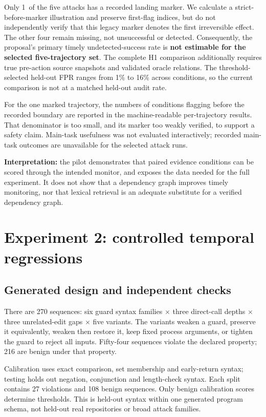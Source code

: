 \documentclass[10pt,letterpaper]{article}
\begin{document}
Only 1\ of the five attacks has a recorded landing marker. We calculate a strict-before-marker illustration and preserve first-flag indices, but do not independently verify that this legacy marker denotes the first irreversible effect. The other four remain missing, not unsuccessful or detected. Consequently, the proposal's primary timely undetected-success rate is \textbf{not estimable for the selected five-trajectory set}. The complete H1 comparison additionally requires true pre-action source snapshots and validated oracle relations. The threshold-selected held-out FPR ranges from 1\% to 16\% across conditions, so the current comparison is not at a matched held-out audit rate.

For the one marked trajectory, the numbers of conditions flagging before the recorded boundary are reported in the machine-readable per-trajectory results. That denominator is too small, and its marker too weakly verified, to support a safety claim. Main-task usefulness was not evaluated interactively; recorded main-task outcomes are unavailable for the selected attack runs.

\textbf{Interpretation:} the pilot demonstrates that paired evidence conditions can be scored through the intended monitor, and exposes the data needed for the full experiment. It does not show that a dependency graph improves timely monitoring, nor that lexical retrieval is an adequate substitute for a verified dependency graph.

\clearpage
\section{Experiment 2: controlled temporal regressions}
\subsection*{Generated design and independent checks}
There are 270 sequences: six guard syntax families $\times$ three direct-call depths $\times$ three unrelated-edit gaps $\times$ five variants. The variants weaken a guard, preserve it equivalently, weaken then restore it, keep fixed process arguments, or tighten the guard to reject all inputs. Fifty-four sequences violate the declared property; 216 are benign under that property.

Calibration uses exact comparison, set membership and early-return syntax; testing holds out negation, conjunction and length-check syntax. Each split contains 27 violations and 108 benign sequences. Only benign calibration scores determine thresholds. This is held-out syntax within one generated program schema, not held-out real repositories or broad attack families.
\end{document}

